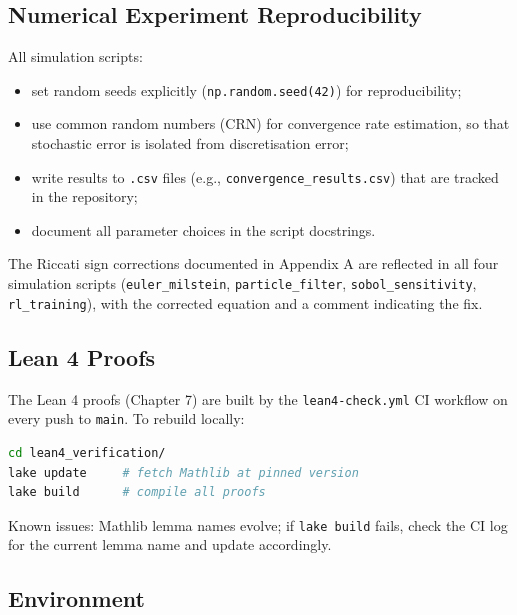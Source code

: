 \subsection{Numerical Experiment Reproducibility}

All simulation scripts:
\begin{itemize}
    \item set random seeds explicitly (\texttt{np.random.seed(42)}) for
    reproducibility;
    \item use common random numbers (CRN) for convergence rate estimation, so
    that stochastic error is isolated from discretisation error;
    \item write results to \texttt{.csv} files (e.g.,
    \texttt{convergence\_results.csv}) that are tracked in the repository;
    \item document all parameter choices in the script docstrings.
\end{itemize}
The Riccati sign corrections documented in Appendix A are reflected in all
four simulation scripts (\texttt{euler\_milstein}, \texttt{particle\_filter},
\texttt{sobol\_sensitivity}, \texttt{rl\_training}), with the corrected equation
and a comment indicating the fix.

\subsection{Lean 4 Proofs}

The Lean 4 proofs (Chapter 7) are built by the \texttt{lean4-check.yml}
CI workflow on every push to \texttt{main}. To rebuild locally:
\begin{lstlisting}[language=bash, caption={Lean 4 local build instructions.}]
cd lean4_verification/
lake update     # fetch Mathlib at pinned version
lake build      # compile all proofs
\end{lstlisting}
Known issues: Mathlib lemma names evolve; if \texttt{lake build} fails, check
the CI log for the current lemma name and update accordingly.

\subsection{Environment}

